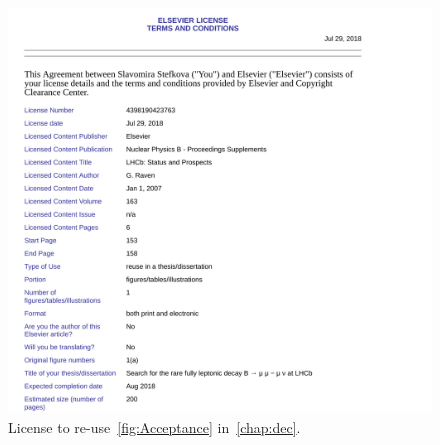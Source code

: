 \label{sec:Licencse}

\begin{figure}[H]
\center
\includegraphics[width = 1.0\textwidth]{figs/detector/license/LicenseProbCrop.pdf}
	\caption{License to re-use~\autoref{fig:Acceptance} in~\autoref{chap:dec}.}
\label{fig:app}
\end{figure}
